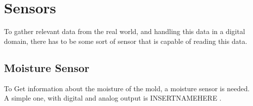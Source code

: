 \section{Sensors}
To gather relevant data from the real world, and handling this data in a digital domain, there has to be some sort of sensor that is capable of reading this data.

\subsection{Moisture Sensor}
To Get information about the moisture of the mold, a moisture sensor is needed. A simple one, with digital and analog output is INSERTNAMEHERE .

